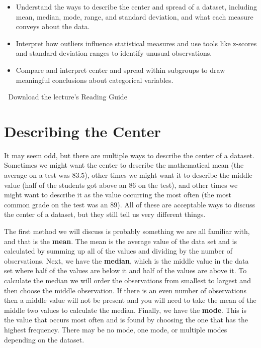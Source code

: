 \documentclass[
  letterpaper,
  DIV=11,
  numbers=noendperiod]{scrreprt}
\providecommand{\tightlist}{%
  \setlength{\itemsep}{0pt}\setlength{\parskip}{0pt}}
\begin{document}
\begin{itemize}
\tightlist
\item
  Understand the ways to describe the center and spread of a dataset,
  including mean, median, mode, range, and standard deviation, and what
  each measure conveys about the data.
\item
  Interpret how outliers influence statistical measures and use tools
  like z-scores and standard deviation ranges to identify unusual
  observations.
\item
  Compare and interpret center and spread within subgroups to draw
  meaningful conclusions about categorical variables.
\end{itemize}

\begin{tcolorbox}[enhanced jigsaw, colframe=quarto-callout-tip-color-frame, colback=white, breakable, rightrule=.15mm, title=\textcolor{quarto-callout-tip-color}{\faLightbulb}\hspace{0.5em}{Supplemental Material}, bottomtitle=1mm, toptitle=1mm, titlerule=0mm, left=2mm, coltitle=black, colbacktitle=quarto-callout-tip-color!10!white, leftrule=.75mm, opacitybacktitle=0.6, bottomrule=.15mm, opacityback=0, arc=.35mm, toprule=.15mm]

📄 Download the lecture's Reading Guide

\end{tcolorbox}

\section{Describing the Center}\label{describing-the-center}

It may seem odd, but there are multiple ways to describe the center of a
dataset. Sometimes we might want the center to describe the mathematical
mean (the average on a test was 83.5), other times we might want it to
describe the middle value (half of the students got above an 86 on the
test), and other times we might want to describe it as the value
occurring the most often (the most common grade on the test was an 89).
All of these are acceptable ways to discuss the center of a dataset, but
they still tell us very different things.

The first method we will discuss is probably something we are all
familiar with, and that is the \textbf{mean}. The mean is the average
value of the data set and is calculated by summing up all of the values
and dividing by the number of observations. Next, we have the
\textbf{median}, which is the middle value in the data set where half of
the values are below it and half of the values are above it. To
calculate the median we will order the observations from smallest to
largest and then choose the middle observation. If there is an even
number of observations then a middle value will not be present and you
will need to take the mean of the middle two values to calculate the
median. Finally, we have the \textbf{mode}. This is the value that
occurs most often and is found by choosing the one that has the highest
frequency. There may be no mode, one mode, or multiple modes depending
on the dataset.
\end{document}
